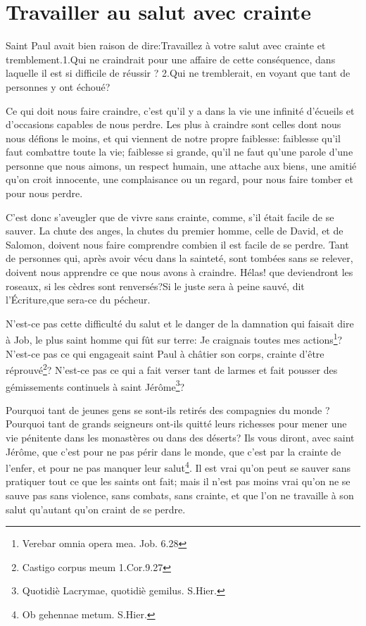 \documentclass[instructions.tex]{subfiles}
\begin{document}
 
\chapter{Travailler au salut avec crainte}
 
Saint Paul avait bien raison de dire:\og Travaillez à votre salut avec crainte et tremblement.\fg 1.Qui ne craindrait pour une affaire de cette conséquence, dans laquelle il est si difficile de réussir ? 2.Qui ne tremblerait, en voyant que tant de personnes y ont échoué? 

\primo Ce qui doit nous faire craindre, c'est qu'il y a dans la vie une infinité d'écueils et d'occasions capables de nous perdre. Les plus à craindre sont celles dont nous nous défions le moins, et qui viennent de notre propre faiblesse: faiblesse qu'il faut combattre toute la vie; faiblesse si grande, qu'il ne faut qu'une parole d'une personne que nous aimons, un respect humain, une attache aux biens, une amitié qu'on croit innocente, une complaisance ou un regard, pour nous faire tomber et pour nous perdre. 

C'est donc s'aveugler que de vivre sans crainte, comme, s'il était facile de se sauver. La chute des anges, la chutes du premier homme, celle de David, et de Salomon, doivent nous faire comprendre combien il est facile de se perdre. Tant de personnes qui, après avoir vécu dans la sainteté, sont tombées sans se relever, doivent nous apprendre ce que nous avons à craindre. Hélas! que deviendront les roseaux, si les cèdres sont renversés?\og Si le juste sera à peine sauvé\fg, dit l'Écriture,\og que sera-ce du pécheur\fg.

N'est-ce pas cette difficulté du salut et le danger de la damnation qui faisait dire à Job, le plus saint homme qui fût sur terre: Je craignais toutes mes actions\footnote{Verebar omnia opera mea. Job. 6.28}? N'est-ce pas ce qui engageait saint Paul à châtier son corps, crainte d'être réprouvé\footnote{Castigo corpus meum 1.Cor.9.27}? N'est-ce pas ce qui a fait verser tant de larmes et fait pousser des gémissements continuels à saint Jérôme\footnote{Quotidiè Lacrymae, quotidiè gemilus. S.Hier.}? 

Pourquoi tant de jeunes gens se sont-ils retirés des compagnies du monde ? Pourquoi tant de grands seigneurs ont-ils quitté leurs richesses pour mener une vie pénitente dans les monastères ou dans des déserts? Ils vous diront, avec saint Jérôme, que c'est pour ne pas périr dans le monde, que c'est par la crainte de l'enfer, et pour ne pas manquer leur salut\footnote{Ob gehennae metum. S.Hier.}. Il est vrai qu'on peut se sauver sans pratiquer tout ce que les saints ont fait; mais il n'est pas moins vrai qu'on ne se sauve pas sans violence, sans combats, sans crainte, et que l'on ne travaille à son salut qu'autant qu'on craint de se perdre. 
\end{document}
